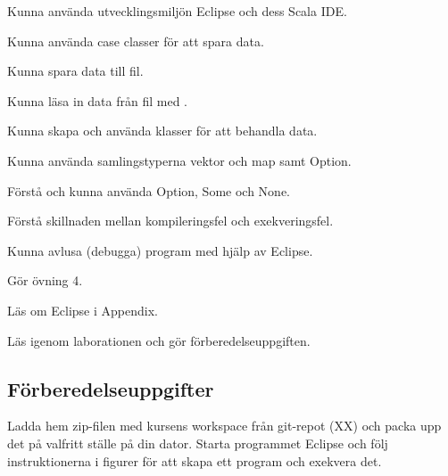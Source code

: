 


\Lab{\LabWeekFOUR}

\begin{Goals}
\item Kunna använda utvecklingsmiljön Eclipse och dess Scala IDE.
\item Kunna använda case classer för att spara data.
\item Kunna spara data till fil.
\item Kunna l{\"a}sa in data fr{\aa}n fil med .
\item Kunna skapa och använda klasser för att behandla data.
\item Kunna använda samlingstyperna vektor och map samt Option.
\item Förstå och kunna använda Option, Some och None. 
\item Förstå skillnaden mellan kompileringsfel och exekveringsfel.
\item Kunna avlusa (debugga) program med hjälp av Eclipse.

\end{Goals}

\begin{Preparations}
\item G{\"o}r {\"o}vning 4. %
\item Läs om Eclipse i Appendix.
\item Läs igenom laborationen och gör förberedelseuppgiften.
\end{Preparations}


\subsection{Förberedelseuppgifter}
\Task Ladda hem zip-filen med kursens workspace från git-repot (XX) och packa upp det på valfritt ställe på din dator. Starta programmet Eclipse och följ instruktionerna i figurer för att skapa ett program och exekvera det.

